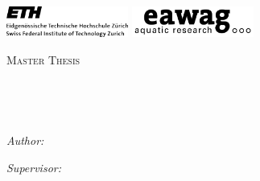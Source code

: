 \documentclass[
11pt, %
english, %
singlespacing, %
headsepline, %
]{MastersDoctoralThesis} %
\author{Sebastiano \textsc{Rusca}} %
\begin{document}
\frontmatter %

\pagestyle{plain} %


\begin{titlepage}


\includegraphics[width=0.3\textwidth]{Figures/eth.png}
\hfill
\includegraphics[width=0.3\textwidth]{Figures/eawag.png}
\vspace{1.5cm}
\begin{center}
\textsc{\Large Master Thesis}\\[0.5cm] %
\vspace{1cm}

\HRule \\[0.4cm] %
{\huge \bfseries \ttitle\par}\vspace{0.4cm} %
\HRule \\[1.5cm] %

\begin{minipage}[t]{0.4\textwidth}
\begin{flushleft} \large
\emph{Author:}\\
\authorname %
\end{flushleft}
\end{minipage}
\begin{minipage}[t]{0.4\textwidth}
\begin{flushright} \large
\emph{Supervisor:} \\
\supname %
\end{flushright}
\end{minipage}\\[3cm]


\end{center}
\end{titlepage}
\end{document}
